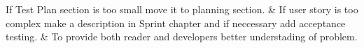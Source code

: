\nextItem If Test Plan section is too small move it to planning section. &
\nextItem If user story is too complex make a description in Sprint chapter and if neccessary add acceptance testing. & To provide both reader and developers better understading of problem.
